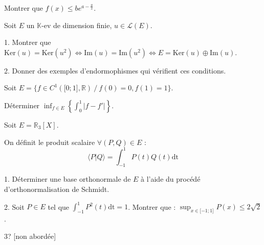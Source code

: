 \vspace{5pt}
\noindent Montrer que $f(x) \leqslant be^{a-\frac {a} {x}}$.



\subetoiles



\noindent Soit $E$ un $\mathbb{K}$-ev de dimension finie, $u \in \mathcal{L}(E)$.

\vspace{5pt}
1. Montrer que $\mathrm{Ker}(u) = \mathrm{Ker}(u^2) \iff \mathrm{Im}(u) = \mathrm{Im}(u^2) \iff E = \mathrm{Ker}(u) \oplus \mathrm{Im}(u)$.

\vspace{5pt}
2. Donner des exemples d'endormophismes qui vérifient ces conditions.



\subetoiles



\noindent Soit $E = \{f \in C^1(\lbrack 0;1 \rbrack, \mathbb{R}) \ / \ f(0) = 0, f(1) = 1\}$.

\vspace{5pt}
\noindent Déterminer $\displaystyle \inf_{f \in E} \left\{ \int_{0}^{1} | f - f'| \right\}$.



\subetoiles



\noindent Soit $E = \mathbb{R}_3[X]$.

\vspace{5pt}
\noindent On définit le produit scalaire $\forall (P,Q) \in E$ :
\[
    \langle P|Q \rangle = \int_{-1}^{1} P(t)Q(t)\mathrm{dt}
\]

\vspace{5pt}
1. Déterminer une base orthonormale de $E$ à l'aide du procédé d'orthonormalisation de Schmidt.

\vspace{5pt}
2. Soit $P \in E$ tel que $\displaystyle \int_{-1}^{1}P^2(t)\mathrm{dt} = 1$.
Montrer que : $\displaystyle \sup_{x \in \lbrack -1; 1 \rbrack} P(x) \leqslant 2 \sqrt{2}$.

\vspace{5pt}
3? [non abordée]



\subetoiles